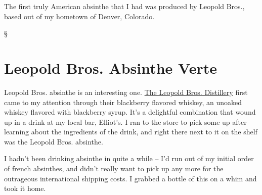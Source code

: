 \documentclass[12pt,letterpaper,oneside]{memoir}
\newcommand\secdiv{
  \begin{center}
    \S
  \end{center}
}
\begin{document}
  The first truly American absinthe that I had was produced by Leopold Bros., based out of my hometown of Denver, Colorado.

  \secdiv

  \section*{Leopold Bros. Absinthe Verte}

  Leopold Bros. absinthe is an interesting one.  \href{http://www.leopoldbros.com/}{The Leopold Bros. Distillery} first came to my attention through their blackberry flavored whiskey, an unoaked whiskey flavored with blackberry syrup.  It's a delightful combination that wound up in a drink at my local bar, Elliot's.  I ran to the store to pick some up after learning about the ingredients of the drink, and right there next to it on the shelf was the Leopold Bros. absinthe.

  I hadn't been drinking absinthe in quite a while -- I'd run out of my initial order of french absinthes, and didn't really want to pick up any more for the outrageous international shipping costs.  I grabbed a bottle of this on a whim and took it home.
\end{document}
